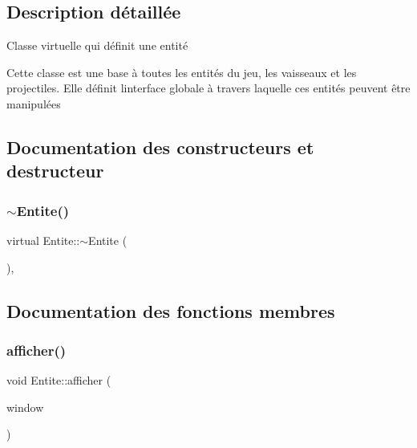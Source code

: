 \subsection{Description détaillée}
Classe virtuelle qui définit une entité 

Cette classe est une base à toutes les entités du jeu, les vaisseaux et les projectiles. Elle définit l\textquotesingle{}interface globale à travers laquelle ces entités peuvent être manipulées 

\subsection{Documentation des constructeurs et destructeur}
\mbox{\label{class_entite_ace3b4604920a7aeba25efb60590e64cb}} 
\subsubsection{\texorpdfstring{$\sim$\+Entite()}{~Entite()}}
{\footnotesize\ttfamily virtual Entite\+::$\sim$\+Entite (\begin{DoxyParamCaption}{ }\end{DoxyParamCaption})\hspace{0.3cm}{\ttfamily [virtual]}, {\ttfamily [default]}}



\subsection{Documentation des fonctions membres}
\mbox{\label{class_entite_ad80a88f81ccc689b9abdfa75bd1e99d6}} 
\subsubsection{\texorpdfstring{afficher()}{afficher()}}
{\footnotesize\ttfamily void Entite\+::afficher (\begin{DoxyParamCaption}\item[{sf\+::\+Render\+Window \&}]{window }\end{DoxyParamCaption})}

\mbox{\label{class_entite_a88c148848289e34ca3bc991c37db9b44}} 
